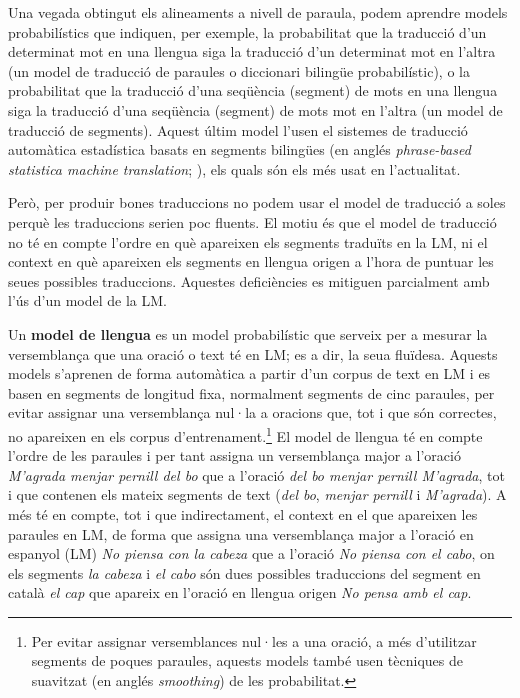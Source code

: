 Una vegada obtingut els alineaments a nivell de paraula, podem
aprendre models probabilístics que indiquen, per exemple, la
probabilitat que la traducció d'un determinat mot en una llengua siga
la traducció d'un determinat mot en l'altra (un model de traducció de
paraules o diccionari bilingüe probabilístic), o la probabilitat que
la traducció d'una seqüència (segment) de mots en una llengua siga la
traducció d'una seqüència (segment) de mots mot en l'altra (un model
de traducció de segments). Aquest últim model l'usen el sistemes de
traducció automàtica estadística basats en segments bilingües (en
anglés \emph{phrase-based statistica machine translation};
\cite{koehnbook}), els quals són els més usat en l'actualitat.

Però, per produir bones traduccions no podem usar el model de
traducció a soles perquè les traduccions serien poc fluents. El motiu
és que el model de traducció no té en compte l'ordre en què apareixen
els segments traduïts en la LM, ni el context en què apareixen els
segments en llengua origen a l'hora de puntuar les seues possibles
traduccions. Aquestes deficiències es mitiguen parcialment amb l'ús
d'un model de la LM.

Un \textbf{model de llengua} es un model probabilístic que serveix per
a mesurar la versemblança que una oració o text té en LM; es a dir, la
seua fluïdesa. Aquests models s'aprenen de forma automàtica a partir
d'un corpus de text en LM i es basen en segments de longitud fixa,
normalment segments de cinc paraules, per evitar assignar una
versemblança nul·la a oracions que, tot i que són correctes, no
apareixen en els corpus d'entrenament.\footnote{Per evitar assignar
  versemblances nul·les a una oració, a més d'utilitzar segments de
  poques paraules, aquests models també usen tècniques de suavitzat
  (en anglés \emph{smoothing}) de les probabilitat.} El model de
llengua té en compte l'ordre de les paraules i per tant assigna un
versemblança major a l'oració \emph{M'agrada menjar pernill del bo}
que a l'oració \emph{del bo menjar pernill M'agrada}, tot i que
contenen els mateix segments de text (\emph{del bo}, \emph{menjar
  pernill} i \emph{M'agrada}). A més té en compte, tot i que
indirectament, el context en el que apareixen les paraules en LM, de
forma que assigna una versemblança major a l'oració en espanyol (LM)
\emph{No piensa con la cabeza} que a l'oració \emph{No piensa con el
  cabo}, on els segments \emph{la cabeza} i \emph{el cabo} són dues
possibles traduccions del segment en català \emph{el cap} que apareix
en l'oració en llengua origen \emph{No pensa amb el cap}.

